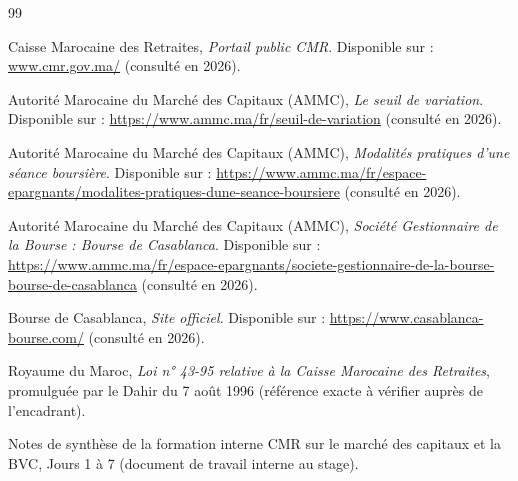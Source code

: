 \documentclass{rapportENSIAS} %
\begin{document}
\begin{thebibliography}{99}

Caisse Marocaine des Retraites, \textit{Portail public CMR}. Disponible sur : \url{www.cmr.gov.ma/} (consulté en 2026).

Autorité Marocaine du Marché des Capitaux (AMMC), \textit{Le seuil de variation}. Disponible sur : \url{https://www.ammc.ma/fr/seuil-de-variation} (consulté en 2026).

Autorité Marocaine du Marché des Capitaux (AMMC), \textit{Modalités pratiques d'une séance boursière}. Disponible sur : \url{https://www.ammc.ma/fr/espace-epargnants/modalites-pratiques-dune-seance-boursiere} (consulté en 2026).

Autorité Marocaine du Marché des Capitaux (AMMC), \textit{Société Gestionnaire de la Bourse : Bourse de Casablanca}. Disponible sur : \url{https://www.ammc.ma/fr/espace-epargnants/societe-gestionnaire-de-la-bourse-bourse-de-casablanca} (consulté en 2026).

Bourse de Casablanca, \textit{Site officiel}. Disponible sur : \url{https://www.casablanca-bourse.com/} (consulté en 2026).

Royaume du Maroc, \textit{Loi n° 43-95 relative à la Caisse Marocaine des Retraites}, promulguée par le Dahir du 7 août 1996 (référence exacte à vérifier auprès de l'encadrant).

Notes de synthèse de la formation interne CMR sur le marché des capitaux et la BVC, Jours 1 à 7 (document de travail interne au stage).

\end{thebibliography}
\end{document}
